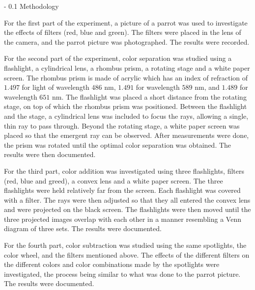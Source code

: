 \documentclass[twoside]{article}
\makeatletter
\renewcommand\section{\@startsection
   {section}{1}{0pt}%
   {-\baselineskip}%
   {0.1\baselineskip}%
   {\normalfont\large\bfseries}}%
\makeatother
\begin{document}
\section{Methodology}
\label{sec:methods}

	For the first part of the experiment, a picture of a parrot was used to investigate the effects of filters (red, blue and green).  The filters were placed in the lens of the camera, and the parrot picture was photographed.  The results were recorded.

For the second part of the experiment, color separation was studied using a flashlight, a cylindrical lens, a rhombus prism, a rotating stage and a white paper screen.  The rhombus prism is made of acrylic which has an index of refraction of $1.497$ for light of wavelength $486$ nm, $1.491$ for wavelength $589$ nm, and $1.489$ for wavelength $651$ nm. The flashlight was placed a short distance from the rotating stage, on top of which the rhombus prism was positioned.  Between the flashlight and the stage, a cylindrical lens was included to focus the rays, allowing a single, thin ray to pass through.  Beyond the rotating stage, a white paper screen was placed so that the emergent ray can be observed. After measurements were done, the prism was rotated until the optimal color separation was obtained.  The results were then documented.

For the third part, color addition was investigated using three flashlights, filters (red, blue and greed), a convex lens and a white paper screen.  The three flashlights were held relatively far from the screen.  Each flashlight was covered with a filter.  The rays were then adjusted so that they all entered the convex lens and were projected on the black screen.  The flashlights were then moved until the three projected images overlap with each other in a manner resembling a Venn diagram of three sets.  The results were documented.
	
    For the fourth part, color subtraction was studied using the same spotlights, the color wheel, and the filters mentioned above.  The effects of the different filters on the different colors and color combinations made by the spotlights were investigated, the process being similar to what was done to the parrot picture.  The results were documented.
	
\end{document}
